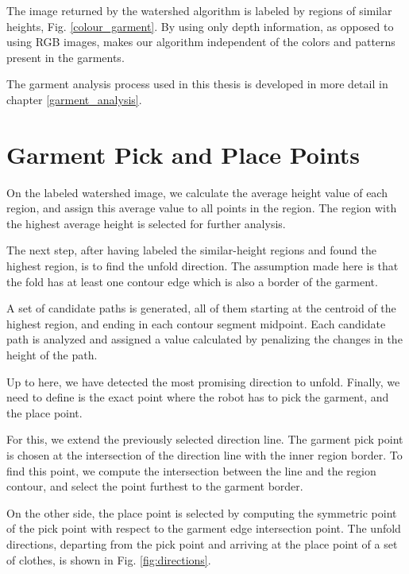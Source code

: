 The image returned by the watershed algorithm is labeled by regions of similar heights, Fig. \ref{colour_garment}. By using only depth information, as opposed to using RGB images, makes our algorithm independent of the colors and patterns present in the garments.

The garment analysis process used in this thesis is developed in more detail in chapter \ref{garment_analysis}.

\section{Garment Pick and Place Points}
On the labeled watershed image, we calculate the average height value of each region, and assign this average value to all points in the region. The region with the highest average height is selected for further analysis. 

The next step, after having labeled the similar-height regions and found the highest region, is to find the unfold direction. The assumption made here is that the fold has at least one contour edge which is also a border of the garment. 

A set of candidate paths is generated, all of them starting at the centroid of the highest region, and ending in each contour segment midpoint. Each candidate path is analyzed and assigned a value calculated by penalizing the changes in the height of the path.

Up to here, we have detected the most promising direction to unfold. Finally, we need to define is the exact point where the robot has to pick the garment, and the place point. 

For this, we extend the previously selected direction line. The garment pick point is chosen at the intersection of the direction line with the inner region border. To find this point, we compute the intersection between the line and the region contour, and select the point furthest to the garment border.

On the other side, the place point is selected by computing the symmetric point of the pick point with respect to the garment edge intersection point. The unfold directions, departing from the pick point and arriving at the place point of a set of clothes, is shown in Fig. \ref{fig:directions}.
